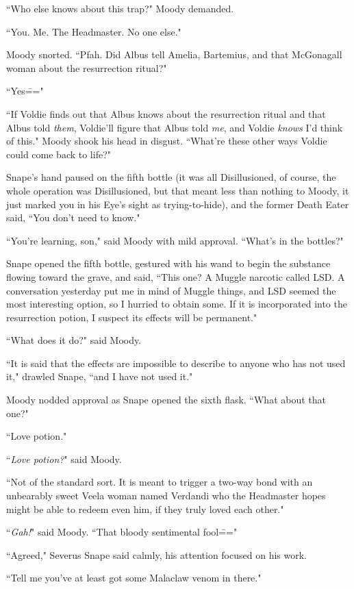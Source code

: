 ``Who else knows about this trap?" Moody demanded.

``You. Me. The Headmaster. No one else."

Moody snorted. ``Pfah. Did Albus tell Amelia, Bartemius, and that McGonagall woman about the resurrection ritual?"

``Yes\==="

``If Voldie finds out that Albus knows about the resurrection ritual and that Albus told \emph{them}, Voldie'll figure that Albus told \emph{me}, and Voldie \emph{knows} I'd think of this." Moody shook his head in disgust. ``What're these other ways Voldie could come back to life?"

Snape's hand paused on the fifth bottle (it was all Disillusioned, of course, the whole operation was Disillusioned, but that meant less than nothing to Moody, it just marked you in his Eye's sight as trying-to-hide), and the former Death Eater said, ``You don't need to know."

``You're learning, son," said Moody with mild approval. ``What's in the bottles?"

Snape opened the fifth bottle, gestured with his wand to begin the substance flowing toward the grave, and said, ``This one? A Muggle narcotic called LSD. A conversation yesterday put me in mind of Muggle things, and LSD seemed the most interesting option, so I hurried to obtain some. If it is incorporated into the resurrection potion, I suspect its effects will be permanent."

``What does it do?" said Moody.

``It is said that the effects are impossible to describe to anyone who has not used it," drawled Snape, ``and I have not used it."

Moody nodded approval as Snape opened the sixth flask. ``What about that one?"

``Love potion."

``\emph{Love potion?}" said Moody.

``Not of the standard sort. It is meant to trigger a two-way bond with an unbearably sweet Veela woman named Verdandi who the Headmaster hopes might be able to redeem even him, if they truly loved each other."

``\emph{Gah!}" said Moody. ``That bloody sentimental fool\==="

``Agreed," Severus Snape said calmly, his attention focused on his work.

``Tell me you've at least got some Malaclaw venom in there."


